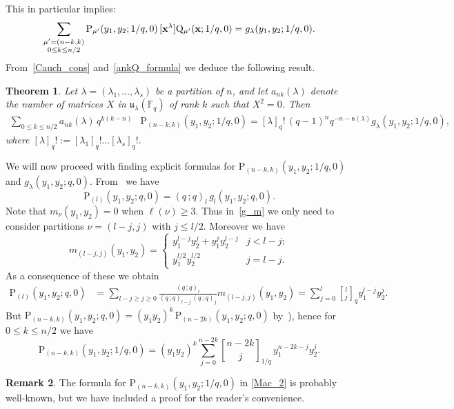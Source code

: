\documentclass[12pt,a4paper,reqno]{amsart}
\theoremstyle{plain}
\newtheorem{theorem}{Theorem}[section]
\newtheorem{lemma}[theorem]{Lemma}
\theoremstyle{definition}
\newtheorem{remark}[theorem]{Remark}
\newcommand{\1}{\mathds{1}}
\renewcommand{\P}{\mathrm{P}}
\newcommand{\Q}{\mathrm{Q}}
\renewcommand{\u}{\mathfrak{u}}
\newcommand{\x}{{\bf x}}
\newcommand{\fn}{\mathsf{n}}
\begin{document}
This in particular implies:
\begin{equation}\label{Cauch_cons}
    \sum_{\substack{\mu'=(n-k,k)
    \\ 0\leq k\leq n/2}}\P_{\mu'}(y_1,y_2;1/q,0)\,[\x^\lambda]\Q_{\mu'}(\x;1/q,0)=g_{\lambda}(y_1,y_2;1/ q,0).
\end{equation}
From~\cref{Cauch_cons} and~\cref{ankQ_formula} we deduce the following result.
\begin{theorem}\label{Cauch_PQg} Let $\lambda = (\lambda_1, \dots, \lambda_s)$ be a partition of $n$, and let $a_{nk}(\lambda)$ denote the number of matrices $X$ in $\u_\lambda(\mathbb{F}_q)$ of rank $k$ such that $X^2 = 0$. Then
\begin{align}\label{Cauch_PQg:eq}
        \sum_{0\leq k\leq n/2} a_{nk}(\lambda)\, q^{k(k-n)}&\P_{(n-k,k)}(y_1,y_2; 1/q,0)
        =[\lambda]_q!\,(q-1)^nq^{-n-\fn(\lambda)}g_{\lambda}(y_1,y_2;1/q,0),
\end{align}
where $[\lambda]_q!:=[\lambda_1]_q!\dots [\lambda_s]_q!$. 
\end{theorem}

We will now proceed with finding  explicit formulas for $\P_{(n-k,k)}(y_1,y_2; 1/q,0)$ and $g_\lambda(y_1,y_2;q,0)$. From~\cite[p. 323, Eq. (4.9)]{Macdonald} 
we have 
$$
\P_{(l)}(y_1,y_2; q,0)=(q\, ; q)_l\, g_l(y_1,y_2;q,0).
$$
Note that $m_{\nu}(y_1,y_2)=0$ when $\ell(\nu)\geq 3$. Thus in~\cref{g_m} we only need to consider partitions $\nu=(l-j,j)$ with $j\leq l/2$. Moreover we have 
$$
m_{(l-j,j)}(y_1,y_2)=
\begin{cases}
y_1^{l-j}y_2^j+y_1^jy_2^{l-j} & j<l-j;\\
y_1^{l/2}y_2^{l/2} & j=l-j.
\end{cases}
$$
As a consequence of these we obtain
\begin{equation*}
    \begin{split}
        \P_{(l)}(y_1,y_2;q,0)
        &=\sum_{l-j\geq j\geq 0}\frac{(q\, ; q)_l}{(q\, ; q)_{l-j}\, (q\, ; q)_j}m_{(l-j,j)}(y_1,y_2)
        =\sum_{j=0}^l {l\brack j}_q y_1^{l-j}y_2^{j}.
    \end{split}
\end{equation*}
But  $
\P_{(n-k,k)}(y_1,y_2; q,0)=(y_1y_2)^k\, \P_{(n-2k)}(y_1,y_2; q,0)
$ by~\cite[p. 325, Eq. (4.17)]{Macdonald}),
 hence for  $0\leq k\leq n/2$ we have
    \begin{equation}\label{Mac_2}
    \P_{(n-k,k)}(y_1,y_2; 1/q,0)=(y_1y_2)^k\sum_{j=0}^{n-2k}{n-2k\brack j}_{1/q}\, y_1^{n-2k-j}y_2^j.
    \end{equation}
\begin{remark}
The formula for $\P_{(n-k,k)}(y_1,y_2; 1/q,0)$
in
\cref{Mac_2} is probably well-known, but we have included a proof for the reader's convenience.
\end{remark}
\end{document}
